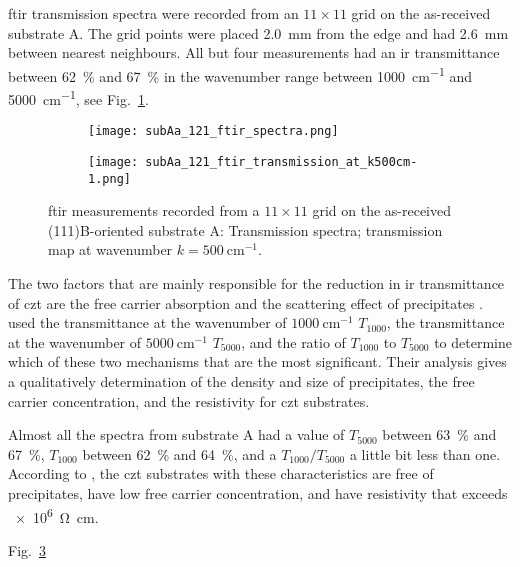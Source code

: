 \Ac{ftir} transmission spectra were recorded from an $11\times11$ grid on the as-received substrate A. The grid points were placed \SI{2.0}{\milli\metre} from the edge and had \SI{2.6}{\milli\metre} between nearest neighbours. All but four measurements had an \ac{ir} transmittance between \SI{62}{\percent} and \SI{67}{\percent} in the wavenumber range between \SI{1000}{\centi\metre^{-1}} and \SI{5000}{\centi\metre^{-1}}, see Fig.~\ref{fig:subAa_ftir_spectra}.

\begin{figure}[htbp]
    \centering
    \begin{subfigure}[t]{0.60175438596\linewidth}
        \texttt{[image: subAa\_121\_ftir\_spectra.png]}
        \caption{}\label{fig:subAa_ftir_spectra}
    \end{subfigure}
    \hfill
    \begin{subfigure}[t]{0.37824561403\linewidth}
        \texttt{[image: subAa\_121\_ftir\_transmission\_at\_k500cm-1.png]}
        \caption{}\label{fig:subAa_ftir_map_500cm-1}
    \end{subfigure}
    \caption[\Ac{ftir} measurements of the as-received substrate A.]{\Acf{ftir} measurements recorded from a $11\times11$ grid on the as-received (111)B-oriented substrate A:  Transmission spectra;  transmission map at wavenumber $k=\SI{500}{\centi\metre^{-1}}$.}
\end{figure}

The two factors that are mainly responsible for the reduction in \ac{ir} transmittance of \ac{czt} are the free carrier absorption and the scattering effect of precipitates \citep{yadava1994precipitation}. \citet{yujie2004infrared} used the transmittance at the wavenumber of $\SI{1000}{\centi\metre^{-1}}$ $T_{1000}$, the transmittance at the wavenumber of $\SI{5000}{\centi\metre^{-1}}$ $T_{5000}$, and the ratio of $T_{1000}$ to $T_{5000}$ to determine which of these two mechanisms that are the most significant. Their analysis gives a qualitatively determination of the density and size of  precipitates, the free carrier concentration, and the resistivity for \ac{czt} substrates.

Almost all the spectra from substrate A had a value of $T_{5000}$ between \SI{63}{\percent} and \SI{67}{\percent}, $T_{1000}$ between \SI{62}{\percent} and \SI{64}{\percent}, and a $T_{1000}/T_{5000}$ a little bit less than one. According to \citet{yujie2004infrared}, the \ac{czt} substrates with these characteristics are free of precipitates, have low free carrier concentration, and have resistivity that exceeds \SI{e6}{\ohm\centi\metre}.

 Fig.~\ref{fig:subAa_ftir_map_500cm-1}

